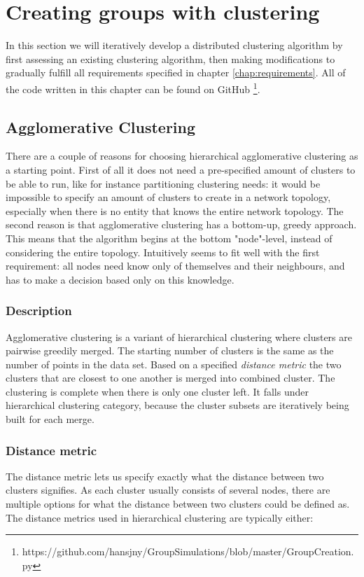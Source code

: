 \section{Creating groups with clustering}
In this section we will iteratively develop a distributed clustering algorithm by first assessing an existing clustering algorithm, then making modifications to 
gradually fulfill all requirements specified in chapter \ref{chap:requirements}. All of the code written in this chapter can be found on GitHub \footnote{https://github.com/hansjny/GroupSimulations/blob/master/GroupCreation.py}.

\subsection {Agglomerative Clustering}
There are a couple of reasons for choosing hierarchical agglomerative clustering as a starting point. First of all it does not need a pre-specified amount of clusters to be able to run,
like for instance partitioning clustering needs: it would be impossible to specify an amount of clusters to create in a network topology, especially when there is no entity that
knows the entire network topology. The second reason is that agglomerative clustering has a bottom-up, greedy approach. This means that the algorithm
begins at the bottom "node"-level, instead of considering the entire topology. Intuitively seems to fit well with the first requirement: all nodes need know only of themselves and their neighbours,
and has to make a decision based only on this knowledge. 

\subsubsection{Description}
Agglomerative clustering  \cite{agglomerative} is a variant of hierarchical clustering where clusters are pairwise greedily merged. The starting number of clusters is the same as the number of
points in the data set. Based on a specified \textit{distance metric} the two clusters that are closest to one another is merged into combined cluster. The clustering is complete
when there is only one cluster left. It falls under hierarchical clustering category, because the cluster subsets are iteratively being built for each merge. 

\subsubsection{Distance metric}
The distance metric lets us specify exactly what the distance between two clusters signifies. As each cluster usually consists of several nodes, there are multiple
options for what the distance between two clusters could be defined as. The distance metrics used in hierarchical clustering are typically either:


